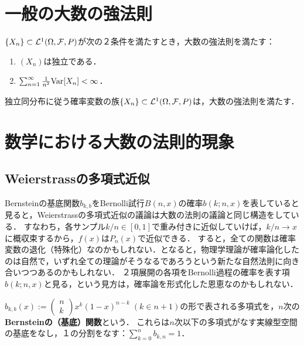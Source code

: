 \documentclass[uplatex,dvipdfmx]{jsreport}
\begin{document}
\section{一般の大数の強法則}

\begin{theorem}[Kolmogorov 1]
    $\{X_n\}\subset\mathcal{L}^1(\Omega,\mathcal{F},P)$が次の２条件を満たすとき，大数の強法則を満たす：
    \begin{enumerate}
        \item $(X_n)$は独立である．
        \item $\sum^\infty_{n=1}\frac{1}{n^2}\mathrm{Var}[X_n]<\infty$．
    \end{enumerate}
\end{theorem}

\begin{theorem}[Kolmogorov 2]
    独立同分布に従う確率変数の族$\{X_n\}\subset\mathcal{L}^1(\Omega,\mathcal{F},P)$は，大数の強法則を満たす．
\end{theorem}

\section{数学における大数の法則的現象}

\subsection{Weierstrassの多項式近似}

\begin{tcolorbox}[colframe=ForestGreen, colback=ForestGreen!10!white,breakable,colbacktitle=ForestGreen!40!white,coltitle=black,fonttitle=\bfseries\sffamily,
title=]
    Bernsteinの基底関数$b_{k,b}$をBernolli試行$B(n,x)$の確率$b(k;n,x)$を表していると見ると，Weierstrassの多項式近似の議論は大数の法則の議論と同じ構造をしている．
    すなわち，各サンプル$k/n\in[0,1]$で重み付きに近似していけば，$k/n\to x$に概収束するから，$f(x)$は$P_n(x)$で近似できる．
    すると，全ての関数は確率変数の退化（特殊化）なのかもしれない．となると，物理学理論が確率論化したのは自然で，いずれ全ての理論がそうなるであろうという新たな自然法則に向き合いつつあるのかもしれない．
    ２項展開の各項をBernolli過程の確率を表す項$b(k;n,x)$と見る，という見方は，確率論を形式化した恩恵なのかもしれない．
\end{tcolorbox}

\begin{definition}
    $b_{k,b}(x):=\begin{pmatrix}n\\k\end{pmatrix}x^k(1-x)^{n-k}\;(k\in n+1)$の形で表される多項式を，$n$次の\textbf{Bernsteinの（基底）関数}という．
    これらは$n$次以下の多項式がなす実線型空間の基底をなし，１の分割をなす：$\sum^n_{k=0}b_{k,n}=1$．
\end{definition}
\end{document}
